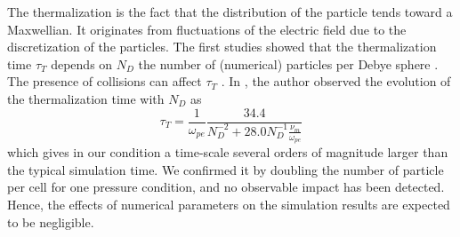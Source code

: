         The thermalization is the fact that the distribution of the particle tends toward a Maxwellian.
        It originates from fluctuations of the electric field due to the discretization of the particles.
        The first studies showed that the thermalization time $\tau_T$ depends on $N_D$ the number of (numerical) particles per Debye sphere \citep{dawson1964,montgomery1970}.
        The presence of collisions can affect $\tau_T$  \citep{turner2006,lai2014}.
        In \citet{turner2006}, the author observed the evolution of the thermalization time with $N_D$ as
        \begin{equation} \label{eq-taut}
          \tau_T = \frac{1}{\omega_{pe}} \frac{34.4}{N_D^{-2} + 28.0 N_D^{-1} \frac{\nu_m}{\omega_{pe}}}
        \end{equation}
        which gives in our condition a time-scale several orders of magnitude larger than the typical simulation time.
        We confirmed it by doubling the number of particle per cell for one pressure condition, and no observable impact has been detected.
        Hence, the effects of numerical parameters on the simulation results are expected to be negligible.
